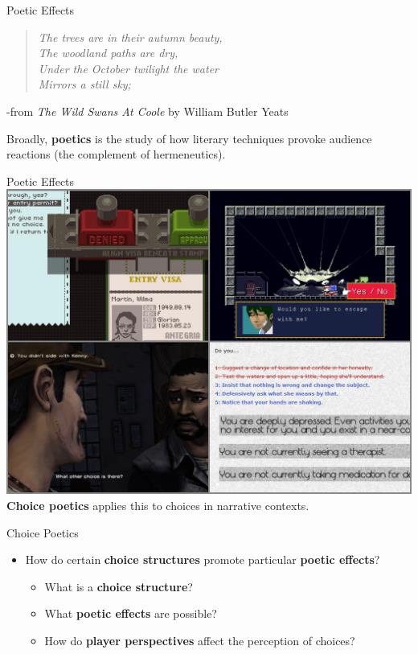 \documentclass[xcolor=x11names]{beamer}
\newcommand{\work}[1]{\textit{#1}\xspace}
\begin{document}
\begin{frame}{Poetic Effects}
  \vfill
  \centering
  \begin{quote}
  \itshape
  The trees are in their autumn beauty, \\
  The woodland paths are dry, \\
  Under the October twilight the water \\
  Mirrors a still sky;
\end{quote}
\raggedleft
  -from \work{The Wild Swans At Coole} by William Butler Yeats \\
  \vfill
  \raggedright
  Broadly, \textbf{poetics} is the study of how literary techniques provoke audience reactions (the complement of hermeneutics).
\end{frame}

\begin{frame}{Poetic Effects}
  \centering
  \includegraphics[height=0.8\textheight]{res/four-choices.png} \\
  \vspace{0.5ex}
  \textbf{Choice poetics} applies this to choices in narrative contexts.
\end{frame}

\begin{frame}{Choice Poetics}
  \vfill
  \begin{itemize}\addtolength{\itemsep}{0.5\baselineskip}
      \item How do certain \textbf{choice structures} promote particular \textbf{poetic effects}?
    \begin{itemize}\addtolength{\itemsep}{0.5\baselineskip}
      \vspace{0.5\baselineskip}
      \item What is a \textbf{choice structure}?
      \item What \textbf{poetic effects} are possible?
      \item How do \textbf{player perspectives} affect the perception of choices?
    \end{itemize}
  \end{itemize}
  \vfill
  \centering
  \tiny
\end{frame}
\end{document}
